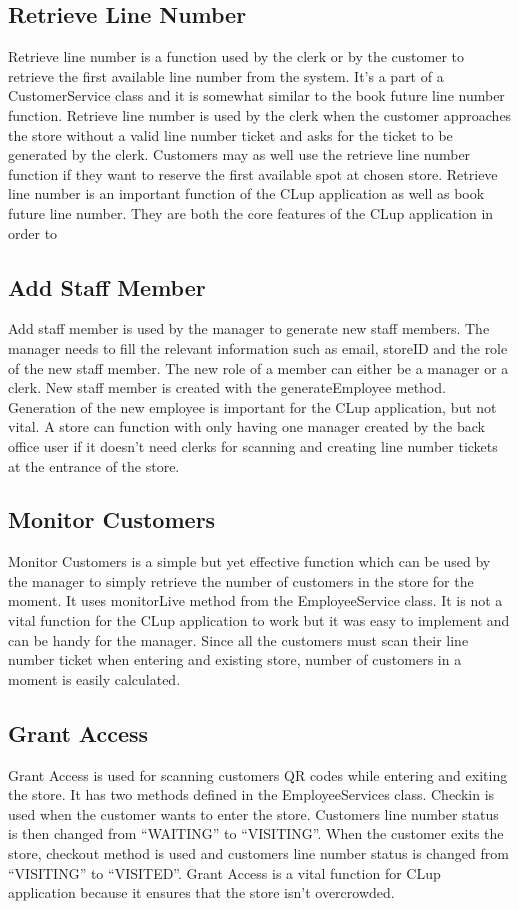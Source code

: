 \subsection{Retrieve Line Number}
Retrieve line number is a function used by the clerk or by the customer to retrieve the first available line number from the system.
It’s a part of a CustomerService class and it is somewhat similar to the book future line number function.
Retrieve line number is used by the clerk when the customer approaches the store without a valid line number ticket and asks for the ticket to be generated by the clerk.
Customers may as well use the retrieve line number function if they want to reserve the first available spot at chosen store.
Retrieve line number is an important function of the CLup application as well as book future line number. They are both the core features of the CLup application in order to

\subsection{Add Staff Member}
Add staff member is used by the manager to generate new staff members. The manager needs to fill the relevant information such as email, storeID and the role of the new staff member.
The new role of a member can either be a manager or a clerk. New staff member is created with the generateEmployee method.
Generation of the new employee is important for the CLup application, but not vital.
A store can function with only having one manager created by the back office user if it doesn’t need clerks for scanning and creating line number tickets at the entrance of the store.

\subsection{Monitor Customers}
Monitor Customers is a simple but yet effective function which can be used by the manager to simply retrieve the number of customers in the store for the moment.
It uses monitorLive method from the EmployeeService class. It is not a vital function for the CLup application to work but it was easy to implement and can be handy for the manager.
Since all the customers must scan their line number ticket when entering and existing store, number of customers in a moment is easily calculated.

\subsection{Grant Access}
Grant Access is used for scanning customers QR codes while entering and exiting the store. It has two methods defined in the EmployeeServices class.
Checkin is used when the customer wants to enter the store. Customers line number status is then changed from “WAITING” to “VISITING”. When the customer exits the store,
checkout method is used and customers line number status is changed from “VISITING” to “VISITED”.
Grant Access is a vital function for CLup application because it ensures that the store isn’t overcrowded.
